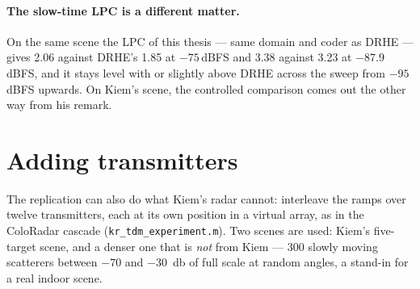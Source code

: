 \paragraph{The slow-time LPC is a different matter.} On the same scene the LPC
of this thesis --- same domain and coder as DRHE --- gives 2.06 against DRHE's
1.85 at $-75$\,dBFS and 3.38 against 3.23 at $-87.9$\,dBFS, and it stays level
with or slightly above DRHE across the sweep from $-95$\,dBFS upwards. On
Kiem's scene, the controlled comparison comes out the other way from his
remark.

\section{Adding transmitters}
\label{sec:kr_tdm}

The replication can also do what Kiem's radar cannot: interleave the ramps
over twelve transmitters, each at its own position in a virtual array, as in
the ColoRadar cascade (\texttt{kr\_tdm\_experiment.m}). Two scenes are used:
Kiem's five-target scene, and a denser one that is \emph{not} from Kiem --- 300
slowly moving scatterers between $-70$ and \SI{-30}{\decibel} of full scale at
random angles, a stand-in for a real indoor scene.

